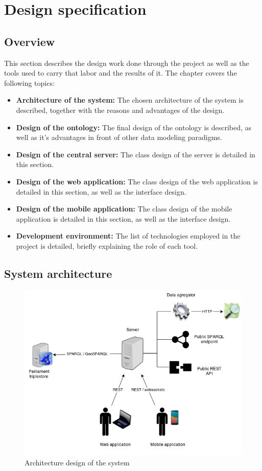 \chapter{Design specification}\label{ch:design}

\section{Overview}

This section describes the design work done through the project as well as the tools used to carry that labor and the results of it. The chapter covers the following topics:

\begin{itemize}
\item \textbf{Architecture of the system:} The chosen architecture of the system is described, together with the reasons and advantages of the design.
\item \textbf{Design of the ontology:} The final design of the ontology is described, as well as it's advantages in front of other data modeling paradigms.
\item \textbf{Design of the central server:} The class design of the server is detailed in this section.
\item \textbf{Design of the web application:} The class design of the web application is detailed in this section, as well as the interface design.
\item \textbf{Design of the mobile application:} The class design of the mobile application is detailed in this section, as well as the interface design.
\item \textbf{Development environment:} The list of technologies employed in the project is detailed, briefly explaining the role of each tool.

\end{itemize}

\section{System architecture}\label{sec:designarch}

\begin{figure}[ht]
  \centering
  \includegraphics[width=.7\textwidth]{fig/architecture}
  \caption{Architecture design of the system}
  \label{fig:architecture}
\end{figure} 

